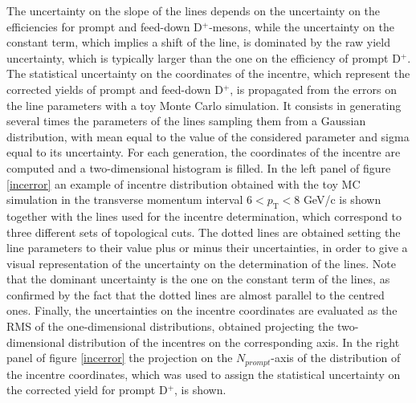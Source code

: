 \documentclass[b5paper,10pt,twoside,oldstyle,classica]{toptesi}
\newcommand{\pt}{p_\text{T}}
\begin{document}
The uncertainty on the slope of the lines depends on the uncertainty on the efficiencies for prompt and feed-down D$^+$-mesons, while the uncertainty on the constant term, which implies a shift of the line, is dominated by the raw yield uncertainty, which is typically larger than the one on the efficiency of prompt D$^+$. The statistical uncertainty on the coordinates of the incentre, which represent the corrected yields of prompt and feed-down D$^+$, is propagated from the errors on the line parameters with a toy Monte Carlo simulation. It consists in generating several times the parameters of the lines sampling them from a Gaussian distribution, with mean equal to the value of the considered parameter and sigma equal to its uncertainty. For each generation, the coordinates of the incentre are computed and a two-dimensional histogram is filled. In the left panel of figure \ref{incerror} an example of incentre distribution obtained with the toy MC simulation in the transverse momentum interval $6<\pt<8$ GeV/c is shown together with the lines used for the incentre determination, which correspond to three different sets of topological cuts. The dotted lines are obtained setting the line parameters to their value plus or minus their uncertainties, in order to give a visual representation of the uncertainty on the determination of the lines. Note that the dominant uncertainty is the one on the constant term of the lines, as confirmed by the fact that the dotted lines are almost parallel to the centred ones. Finally, the uncertainties on the incentre coordinates are evaluated as the RMS of the one-dimensional distributions, obtained projecting the two-dimensional distribution of the incentres on the corresponding axis. In the right panel of figure \ref{incerror} the projection on the $N_{prompt}$-axis of the distribution of the incentre coordinates, which was used to assign the statistical uncertainty on the corrected yield for prompt D$^+$, is shown.     
\end{document}
